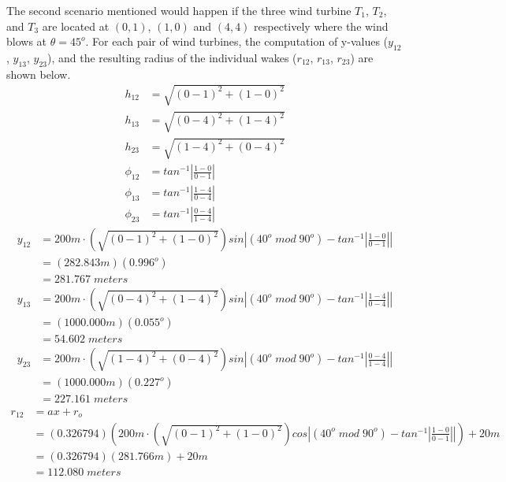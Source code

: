     The second scenario mentioned would happen if the three wind turbine $T_1$, $T_2$, and $T_3$ are located at $(0,1)$, $(1,0)$ and $(4,4)$ respectively where the wind blows at $\theta=45^o$. For each pair of wind turbines, the computation of  y-values ($y_{12}$, $y_{13}$, $y_{23}$), and the resulting radius of the individual wakes ($r_{12}$, $r_{13}$, $r_{23}$) are shown below.
    \begin{align*}
    	h_{12} &= \sqrt{(0-1)^2+(1-0)^2} \\
    	h_{13} &= \sqrt{(0-4)^2+(1-4)^2} \\
    	h_{23} &= \sqrt{(1-4)^2+(0-4)^2} \\
    	\phi_{12} &= tan^{-1}\left| \frac{1-0}{0-1}\right| \\
    	\phi_{13} &= tan^{-1}\left| \frac{1-4}{0-4}\right| \\
    	\phi_{23} &= tan^{-1}\left| \frac{0-4}{1-4}\right|
    \end{align*}
    \begin{align*}
        y_{12}
        &=200m\cdot \left( \sqrt{(0-1)^2+(1-0)^2} \right) sin \left| (40^o\;mod\;90^o) - tan^{-1}\left|\frac{1-0}{0-1}\right| \right| \\
        &=\left( 282.843m \right)(0.996^o) \\
        &= 281.767\;meters
    \end{align*}
    \begin{align*}
        y_{13}
        &=200m\cdot \left( \sqrt{(0-4)^2+(1-4)^2} \right) sin \left| (40^o\;mod\;90^o) - tan^{-1}\left|\frac{1-4}{0-4}\right| \right| \\
        &=\left( 1000.000m \right)(0.055^o) \\
        &= 54.602\;meters
    \end{align*}
    \begin{align*}
        y_{23}
        &=200m\cdot \left( \sqrt{(1-4)^2+(0-4)^2} \right) sin \left| (40^o\;mod\;90^o) - tan^{-1}\left|\frac{0-4}{1-4}\right| \right| \\
        &=\left( 1000.000m \right)(0.227^o) \\
        &= 227.161\;meters
    \end{align*}
    \begin{align*}
        r_{12}
        &= ax+r_o \\
        &= (0.326794)\left( 200m\cdot \left( \sqrt{(0-1)^2+(1-0)^2} \right)cos \left| (40^o\;mod\;90^o) - tan^{-1}\left|\frac{1-0}{0-1}\right| \right|  \right) + 20m \\
        &=(0.326794)(281.766m)+20m \\
        &= 112.080\;meters
    \end{align*}
